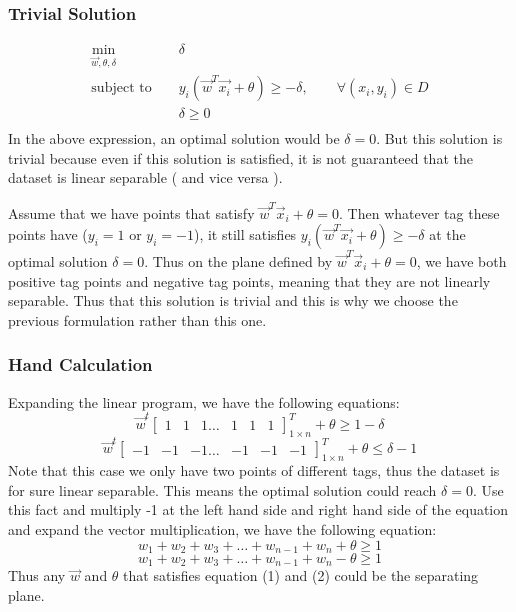\subsubsection{Trivial Solution}
\begin{eqnarray*}
    	\min_{\vec{w}, \theta, \delta} & & \delta  \\
    	\textrm{subject to } & & y_i(\vec{w}^T \vec{x_i} + \theta) \geq - \delta, \qquad \forall (x_i,y_i) \in D \\
    	&& \delta \geq 0  \\
\end{eqnarray*}
In the above expression, an optimal solution would be $\delta=0$. But this solution is trivial because even if this solution is satisfied, it is not guaranteed that the dataset is linear separable ( and vice versa ). 

\noindent Assume that we have points that satisfy $\vec{w}^T\vec{x}_i+\theta=0$. Then whatever tag these points have ($y_i=1$ or $y_i=-1$), it still satisfies $ y_i(\vec{w}^T \vec{x_i} + \theta) \geq - \delta$ at the optimal solution $\delta=0$. Thus on the plane defined by $\vec{w}^T\vec{x}_i+\theta=0$, we have both positive tag points and negative tag points, meaning that they are not linearly separable. Thus that this solution is trivial and this is why we choose the previous formulation rather than this one.  
\subsubsection{Hand Calculation}
Expanding the linear program, we have the following equations:
\begin{equation*}
\vec{w}^t\begin{bmatrix}
1& 1& 1 \ldots & 1 & 1 & 1
\end{bmatrix}^T_{1\times n}+\theta\geq 1-\delta
\end{equation*}
\begin{equation*}
\vec{w}^t\begin{bmatrix}
-1& -1& -1 \ldots & -1 & -1 & -1
\end{bmatrix}^T_{1\times n}+\theta\leq \delta-1
\end{equation*}
\noindent Note that this case we only have two points of different tags, thus the dataset is for sure linear separable. This means the optimal solution could reach $\delta=0$.  Use this fact and multiply -1 at the left hand side and right hand side of the equation and expand the vector multiplication, we have the following equation:
\begin{equation}
w_1+w_2+w_3+\ldots+w_{n-1}+w_n+\theta\geq 1
\end{equation}
\begin{equation}
w_1+w_2+w_3+\ldots+w_{n-1}+w_n-\theta\geq 1
\end{equation}
Thus any $\vec{w}$ and $\theta$  that satisfies equation (1) and (2) could be the separating plane.

